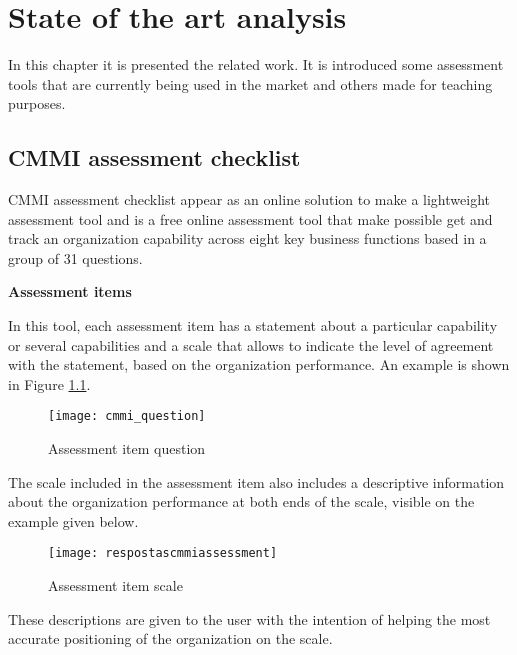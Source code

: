 \chapter{State of the art analysis}\label{chap:chap3}

In this chapter it is presented the related work. It is introduced  some assessment tools that are currently being used in the market and others made for teaching purposes.

\section{CMMI assessment checklist}

CMMI assessment checklist \citep{capabilityassess} appear as an online solution to make a lightweight assessment tool and is a free online assessment tool that make possible get and track an organization capability across eight key business functions based in a group of 31 questions.


\textbf{Assessment items}

In this tool, each assessment item has a statement about a particular capability or several capabilities and a scale that allows to indicate the level of agreement with the statement, based on the organization performance. An example is shown in Figure \ref{fig:cmmi_question}.

\begin{figure}[h]
	\begin{center}
		\leavevmode
		\texttt{[image: cmmi\_question]}
		\caption{Assessment item question}
		\label{fig:cmmi_question}
	\end{center}
\end{figure}

The scale included in the assessment item also includes a descriptive information about the organization performance at both ends of the scale, visible on the example given below.

\begin{figure}[h]
	\begin{center}
		\leavevmode
		\texttt{[image: respostascmmiassessment]}
		\caption{Assessment item scale}
		\label{fig:assesment_answer}
	\end{center}
\end{figure}

These descriptions are given to the user with the intention of helping the most accurate positioning of the organization on the scale.

